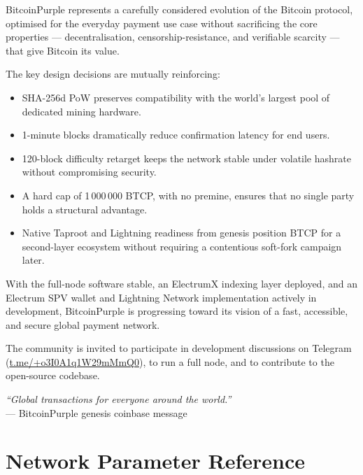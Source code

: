 \documentclass[12pt, a4paper]{article}
\begin{document}
BitcoinPurple represents a carefully considered evolution of the Bitcoin
protocol, optimised for the everyday payment use case without sacrificing the
core properties — decentralisation, censorship-resistance, and verifiable
scarcity — that give Bitcoin its value.

The key design decisions are mutually reinforcing:
\begin{itemize}[noitemsep]
  \item SHA-256d PoW preserves compatibility with the world's largest pool of
        dedicated mining hardware.
  \item 1-minute blocks dramatically reduce confirmation latency for end users.
  \item 120-block difficulty retarget keeps the network stable under volatile
        hashrate without compromising security.
  \item A hard cap of 1\,000\,000 BTCP, with no premine, ensures that no single
        party holds a structural advantage.
  \item Native Taproot and Lightning readiness from genesis position BTCP for
        a second-layer ecosystem without requiring a contentious soft-fork
        campaign later.
\end{itemize}

With the full-node software stable, an ElectrumX indexing layer deployed, and
an Electrum SPV wallet and Lightning Network implementation actively in
development, BitcoinPurple is progressing toward its vision of a fast,
accessible, and secure global payment network.

The community is invited to participate in development discussions on Telegram
(\href{https://t.me/+o3I0A1q1W29mMmQ0}{t.me/+o3I0A1q1W29mMmQ0}),
to run a full node, and to contribute to the open-source codebase.

\vspace{1cm}
\begin{center}
\textit{``Global transactions for everyone around the world.''}\\
{\small — BitcoinPurple genesis coinbase message}
\end{center}

\newpage
\appendix
\section{Network Parameter Reference}
\end{document}
